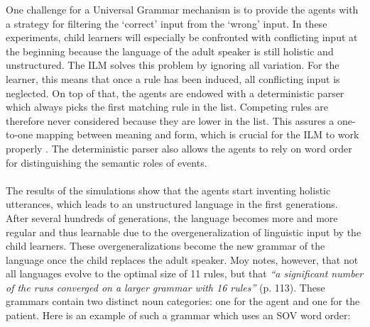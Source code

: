 One challenge for a Universal Grammar mechanism is to provide the agents with a strategy for filtering the `correct' input from the `wrong' input. In these experiments, child learners will especially be confronted with conflicting input at the beginning because the language of the adult speaker is still holistic and unstructured. The ILM solves this problem by ignoring all variation. For the learner, this means that once a rule has been induced, all conflicting input is neglected. On top of that, the agents are endowed with a deterministic parser which always picks the first matching rule in the list. Competing rules are therefore never considered because they are lower in the list. This assures a one-to-one mapping between meaning and form, which is crucial for the ILM to work properly \citep{smith03transmission}. The deterministic parser also allows the agents to rely on word order for distinguishing the semantic roles of events.
\\
\\
 The results of the simulations show that the agents start inventing holistic utterances, which leads to an unstructured language in the first generations. After several hundreds of generations, the language becomes more and more regular and thus learnable due to the overgeneralization of linguistic input by the child learners. These overgeneralizations become the new grammar of the language once the child replaces the adult speaker. Moy notes, however, that not all languages evolve to the optimal size of 11 rules, but that {\em ``a significant number of the runs converged on a larger grammar with 16 rules''} (p. 113). These grammars contain two distinct noun categories: one for the agent and one for the patient. Here is an example of such a grammar which uses an SOV word order:

